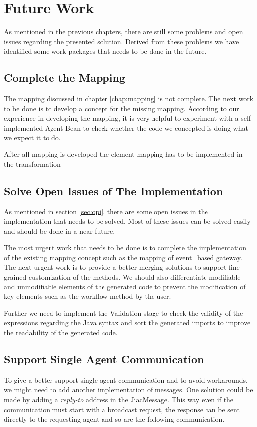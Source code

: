 \section{Future Work}
As mentioned in the previous chapters, there are still some problems and open issues regarding the presented solution. Derived from these problems we have identified some work packages that needs to be done in the future.
\subsection{Complete the Mapping}
The mapping discussed in chapter \ref{chap:mapping} is not complete. The next work to be done is to develop a concept for the missing mapping. According to our experience in developing the mapping, it is very helpful to experiment with a self implemented Agent Bean to check whether the code we concepted is doing what we expect it to do.

After all mapping is developed the element mapping has to be implemented in the transformation

\subsection{Solve Open Issues of The Implementation}
As mentioned in section \ref{sec:opi}, there are some open issues in the implementation that needs to be solved. Most of these issues can be solved easily and should be done in a near future. 

The most urgent work that needs to be done is to complete the implementation of the existing mapping concept such as the mapping of event\_based gateway. 
The next urgent work is to provide a better merging solutions to support fine grained customization of the methods. We should also differentiate modifiable and unmodifiable elements of the generated code to prevent the modification of key elements such as the workflow method by the user. 

Further we need to implement the Validation stage to check the validity of the expressions regarding the Java syntax and sort the generated imports to improve the readability of the generated code. 

\subsection{Support Single Agent Communication}
To give a better support single agent communication and to avoid workarounds, we might need to add another implementation of messages. One solution could be made by adding a \textit{reply-to} address in the JiacMessage. This way even if the communication must start with a broadcast request, the response can be sent directly to the requesting agent and so are the following communication. 

